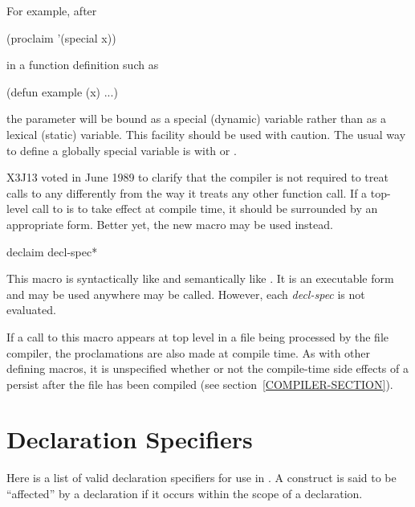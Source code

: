 \begin{defun}[Function]
For example, after
\begin{lisp}
(proclaim '(special x))
\end{lisp}
in a function definition such as
\begin{lisp}
(defun example (x) ...)
\end{lisp}
the parameter  will be bound as a special (dynamic) variable
rather than as a lexical (static) variable.  This facility should
be used with caution.  The usual way to define a globally special
variable is with  or .
\end{defun}

\begin{newer}
X3J13 voted in June 1989 
to clarify that the compiler is not required to treat
calls to  any differently from the way it treats
any other function call.  If a top-level call to 
is to take effect at compile time, it should be surrounded
by an appropriate  form.  Better yet,
the new macro  may be used instead.

\begin{defmac}
declaim {decl-spec}*

This macro is syntactically like  and semantically
like .  It is an executable form and may be used
anywhere  may be called.  However, each \emph{decl-spec}
is not evaluated.

If a call to this macro appears at top level in a file
  being processed by the file compiler, the proclamations are also
  made at compile time.  As with other defining macros, it is 
  unspecified whether or not the compile-time side effects of a 
   persist after the file has been compiled
  (see section~\ref{COMPILER-SECTION}).
\end{defmac}
\end{newer}

\section{Declaration Specifiers}
\label{DECLARATION-SPECIFIERS-SECTION}

Here is a list of valid declaration specifiers for use in
.  A construct is said to be ``affected'' by a declaration
if it occurs within the scope of a declaration.

